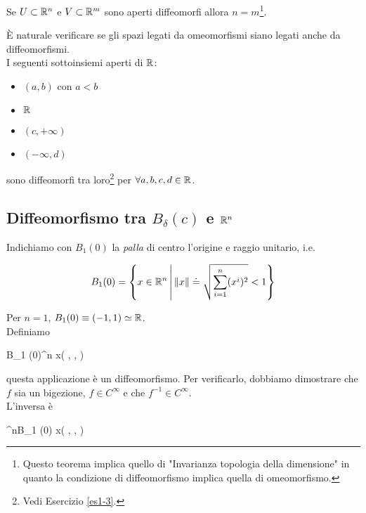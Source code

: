 \begin{theorem}
	Se $ U \subset \mathbb{R}^{n} $ e $ V \subset \mathbb{R}^{m} $ sono aperti diffeomorfi allora $ n = m $\footnote{%
		Questo teorema implica quello di "Invarianza topologia della dimensione" in quanto la condizione di diffeomorfismo implica quella di omeomorfismo.}.
\end{theorem}

È naturale verificare se gli spazi legati da omeomorfismi siano legati anche da diffeomorfismi.\\
I seguenti sottoinsiemi aperti di $ \mathbb{R} $:

\begin{itemize}
	\item $ (a,b) $ con $ a < b $
	
	\item $ \mathbb{R} $
	
	\item $ (c, + \infty) $
	
	\item $ (- \infty, d) $
\end{itemize}

sono diffeomorfi tra loro\footnote{%
	Vedi Esercizio \ref{es1-3}.%
} per $ \forall a,b,c,d \in \mathbb{R} $.

\subsection{Diffeomorfismo tra $ B_{\delta} (c) $ e $ \mathbb{R}^{n} $}

Indichiamo con $ B_{1} (0) $ la \textit{palla} di centro l'origine e raggio unitario, i.e.

\begin{equation}
	B_{1} (0) = \left\{ x \in \mathbb{R}^{n} \, \middle| \, \norm{x} \doteq \sqrt{\sum_{i=1}^{n} (x^{i})^{2}} < 1 \right\}
\end{equation}

Per $ n=1 $, $ B_{1} (0) \equiv (-1,1) \simeq \mathbb{R} $.\\
Definiamo

	{B_{1} (0)}{\R^{n}}
	{x}{\left( , \cdots,  \right)}

questa applicazione è un diffeomorfismo. Per verificarlo, dobbiamo dimostrare che $ f $ sia un bigezione, $ f \in C^{\infty} $ e che $ f^{-1} \in C^{\infty} $.\\
L'inversa è

	{\R^{n}}{B_{1} (0)}
	{x}{\left( , \cdots,  \right)}

